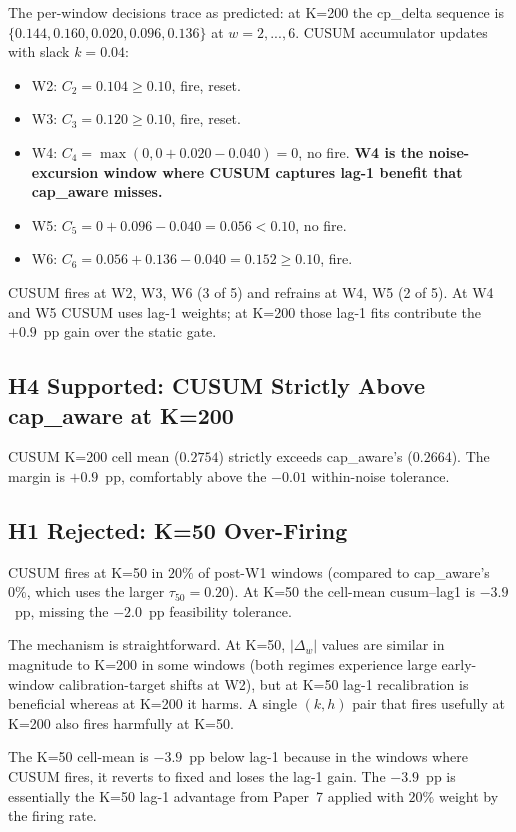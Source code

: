The per-window decisions trace as predicted: at K=200 the cp\_delta
sequence is $\{0.144, 0.160, 0.020, 0.096, 0.136\}$ at $w = 2, ..., 6$.
CUSUM accumulator updates with slack $k = 0.04$:
\begin{itemize}
\item W2: $C_2 = 0.104 \geq 0.10$, fire, reset.
\item W3: $C_3 = 0.120 \geq 0.10$, fire, reset.
\item W4: $C_4 = \max(0, 0 + 0.020 - 0.040) = 0$, no fire. \textbf{W4
is the noise-excursion window where CUSUM captures lag-1 benefit
that cap\_aware misses.}
\item W5: $C_5 = 0 + 0.096 - 0.040 = 0.056 < 0.10$, no fire.
\item W6: $C_6 = 0.056 + 0.136 - 0.040 = 0.152 \geq 0.10$, fire.
\end{itemize}

CUSUM fires at W2, W3, W6 (3 of 5) and refrains at W4, W5 (2 of 5).
At W4 and W5 CUSUM uses lag-1 weights; at K=200 those lag-1 fits
contribute the $+0.9$~pp gain over the static gate.

\subsection{H4 Supported: CUSUM Strictly Above cap\_aware at K=200}

CUSUM K=200 cell mean ($0.2754$) strictly exceeds cap\_aware's
($0.2664$). The margin is $+0.9$~pp, comfortably above the $-0.01$
within-noise tolerance.



\subsection{H1 Rejected: K=50 Over-Firing}

CUSUM fires at K=50 in $20\%$ of post-W1 windows (compared to
cap\_aware's $0\%$, which uses the larger $\tau_{50} = 0.20$). At
K=50 the cell-mean cusum--lag1 is $-3.9$~pp, missing the $-2.0$~pp
feasibility tolerance.

The mechanism is straightforward. At K=50, $|\Delta_w|$ values are
similar in magnitude to K=200 in some windows (both regimes
experience large early-window calibration-target shifts at W2),
but at K=50 lag-1 recalibration is beneficial whereas at K=200 it
harms. A single $(k, h)$ pair that fires usefully at K=200 also
fires harmfully at K=50.

The K=50 cell-mean is $-3.9$~pp below lag-1 because in the windows
where CUSUM fires, it reverts to fixed and loses the lag-1 gain. The
$-3.9$~pp is essentially the K=50 lag-1 advantage from Paper~7
applied with $20\%$ weight by the firing rate.

